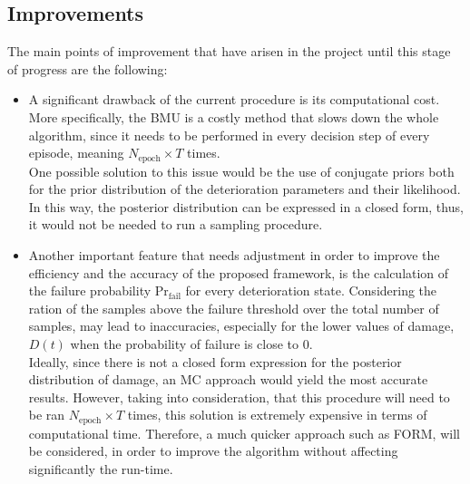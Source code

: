 

\subsection{Improvements}


The main points of improvement that have arisen in the project until this stage of progress are the following:
\begin{itemize}
    \item A significant drawback of the current procedure is its computational cost. More specifically, the \gls{BMU} is a costly method that slows down the whole algorithm, since it needs to be performed in every decision step of every episode, meaning $N_{\text{epoch}} \times T$ times.\\
    One possible solution to this issue would be the use of conjugate priors both for the prior distribution of the deterioration parameters and their likelihood. In this way, the posterior distribution can be expressed in a closed form, thus, it would not be needed to run a sampling procedure.
    \item Another important feature that needs adjustment in order to improve the efficiency and the accuracy of the proposed framework, is the calculation of the failure probability $\text{Pr}_{\text{fail}}$ for every deterioration state. Considering the ration of the samples above the failure threshold over the total number of samples, may lead to inaccuracies, especially for the lower values of damage, $D(t)$ when the probability of failure is close to 0.\\
    Ideally, since there is not a closed form expression for the posterior distribution of damage, an \gls{MC} approach would yield the most accurate results. However, taking into consideration, that this procedure will need to be ran $N_{\text{epoch}} \times T$ times, this solution is extremely expensive in terms of computational time. Therefore, a much quicker approach such as \gls{FORM}, will be considered, in order to improve the algorithm without affecting significantly the run-time.
\end{itemize}






